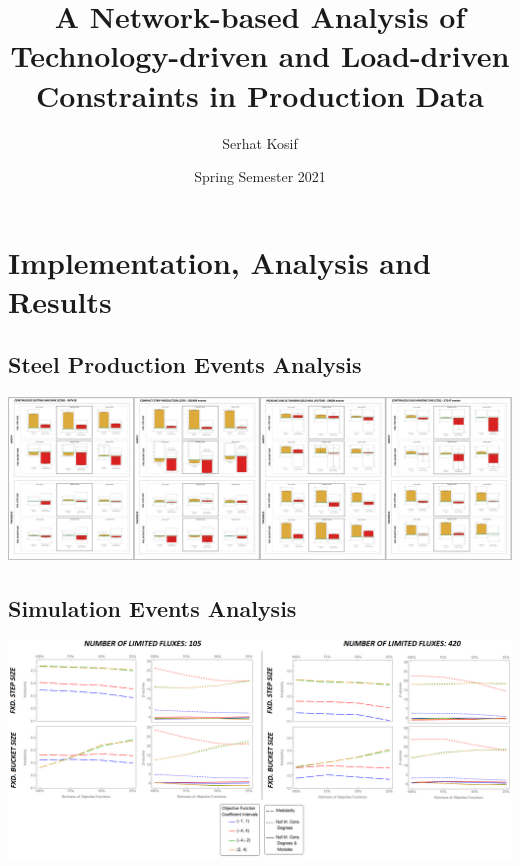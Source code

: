 \documentclass[aspectratio=169]{beamer}
\title{A Network-based Analysis of Technology-driven and Load-driven Constraints in Production Data}
\author{Serhat Kosif}
\institute{Jacobs University}
\date{Spring Semester 2021}
\begin{document}
	
	\begin{frame}[plain]
		\titlepage
	\end{frame}
	
\section[Outline]{}
	
	\begin{frame}
		\tableofcontents
	\end{frame}




	
\section[Implementation, Analysis and Results]{Implementation, Analysis and Results}
	\subsection[Steel Production Events Analysis]{Steel Production Events Analysis}
	\begin{frame}
		\centering
		\includegraphics[width=\textwidth]{../tables/results-real_life_events_analysis-results.png}
	\end{frame}
	\subsection[Simulation Events Analysis]{Simulation Events Analysis}
	\begin{frame}
		\centering
		\includegraphics[width=\textwidth]{../tables/results-simulation-results.png}
	\end{frame}
	
\end{document}
